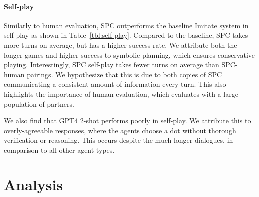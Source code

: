 \documentclass[11pt]{article}
\newcommand{\system}{SPC}
\begin{document}
\paragraph{Self-play}
Similarly to human evaluation,
\system{} outperforms the baseline Imitate system in self-play as shown in Table~\ref{tbl:self-play}.
Compared to the baseline, \system{} takes more turns on average, but
has a higher success rate.
We attribute both the longer games and higher success to symbolic planning, which ensures conservative playing.
Interestingly, \system{} self-play takes fewer turns on average than \system-human pairings.
We hypothesize that this is due to both copies of \system{} communicating a consistent amount of information every turn.
This also highlights the importance of human evaluation, which evaluates with a large population of partners.

We also find that GPT4 2-shot performs poorly in self-play. We attribute this to overly-agreeable responses, where the agents choose a dot without thorough verification or reasoning. This occurs despite the much longer dialogues, in comparison to all other agent types.

\begin{table}[!t]
\centering
{}
\caption{\label{tbl:self-play}
The success rate of different agents in 200 self-play games on the hardest setting of \textsc{OneCommon}, with 4 shared dots.
A higher success rate is better.
The human performance is from the \textsc{OneCommon} dataset
\citep{onecommon}.
}
\end{table}


\section{Analysis}
\end{document}
